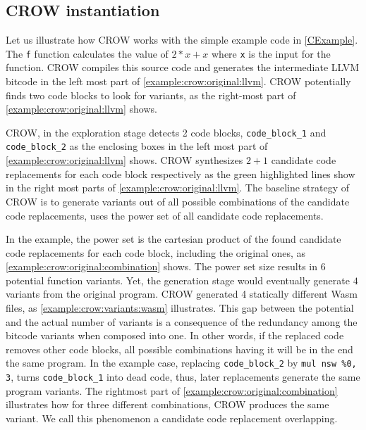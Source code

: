 
\subsection*{CROW instantiation}

Let us illustrate how CROW works with the simple example code in \autoref{CExample}. The \texttt{f} function calculates the value of $2 * x + x$ where \texttt{x} is the input for the function.  CROW compiles this source code and generates the intermediate LLVM bitcode in the left most part of \autoref{example:crow:original:llvm}. CROW potentially finds two code blocks to look for variants, as the right-most part of \autoref{example:crow:original:llvm} shows.


    

CROW, in the exploration stage detects 2 code blocks, \texttt{code\_block\_1} and \texttt{code\_block\_2} as the enclosing boxes in the left most part of \autoref{example:crow:original:llvm} shows. CROW synthesizes $2 + 1$ candidate code replacements for each code block respectively as the green highlighted lines show in the right most parts of \autoref{example:crow:original:llvm}.
The baseline strategy of CROW is to generate variants out of all possible combinations of the candidate code replacements, \ie uses the power set of all candidate code replacements.

In the example, the power set is the cartesian product of the found candidate code replacements for each code block, including the original ones, as \autoref{example:crow:original:combination} shows. The power set size results in $6$ potential function variants. Yet, the generation stage would eventually generate $4$ variants from the original program. CROW generated 4 statically different Wasm files, as \autoref{example:crow:variants:wasm} illustrates. This gap between the potential and the actual number of variants is a consequence of the redundancy among the bitcode variants when composed into one. In other words, if the replaced code removes other code blocks, all possible combinations having it will be in the end the same program. In the example case, replacing \texttt{code\_block\_2} by \texttt{mul nsw \%0, 3}, turns \texttt{code\_block\_1} into dead code, thus, later replacements generate the same program variants. The rightmost part of \autoref{example:crow:original:combination} illustrates how for three different combinations, CROW produces the same variant. We call this phenomenon a candidate code replacement overlapping.

